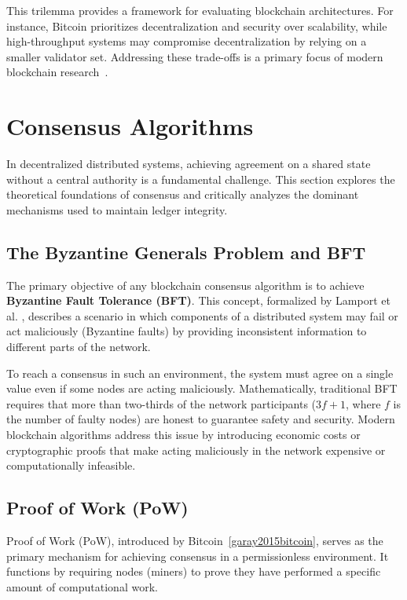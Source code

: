 This trilemma provides a framework for evaluating blockchain architectures. For instance, Bitcoin prioritizes decentralization and security over scalability, while high-throughput systems may compromise decentralization by relying on a smaller validator set. Addressing these trade-offs is a primary focus of modern blockchain research~\cite{blockchainTrilemma}.


\section{Consensus Algorithms} \label{ch2_consensus}

In decentralized distributed systems, achieving agreement on a shared state without a central authority is a fundamental challenge. This section explores the theoretical foundations of consensus and critically analyzes the dominant mechanisms used to maintain ledger integrity.

\subsection{The Byzantine Generals Problem and BFT} \label{ch2_consensus_bft}
The primary objective of any blockchain consensus algorithm is to achieve \textbf{Byzantine Fault Tolerance (BFT)}. This concept, formalized by Lamport et al. \cite{lamport1982byzantine}, describes a scenario in which components of a distributed system may fail or act maliciously (Byzantine faults) by providing inconsistent information to different parts of the network.

To reach a consensus in such an environment, the system must agree on a single value even if some nodes are acting maliciously. Mathematically, traditional BFT requires that more than two-thirds of the network participants ($3f + 1$, where $f$ is the number of faulty nodes) are honest to guarantee safety and security. Modern blockchain algorithms address this issue by introducing economic costs or cryptographic proofs that make acting maliciously in the network expensive or computationally infeasible.

\subsection{Proof of Work (PoW)} \label{ch2_consensus_pow}
Proof of Work (PoW), introduced by Bitcoin~\ref{garay2015bitcoin}, serves as the primary mechanism for achieving consensus in a permissionless environment. It functions by requiring nodes (miners) to prove they have performed a specific amount of computational work.

